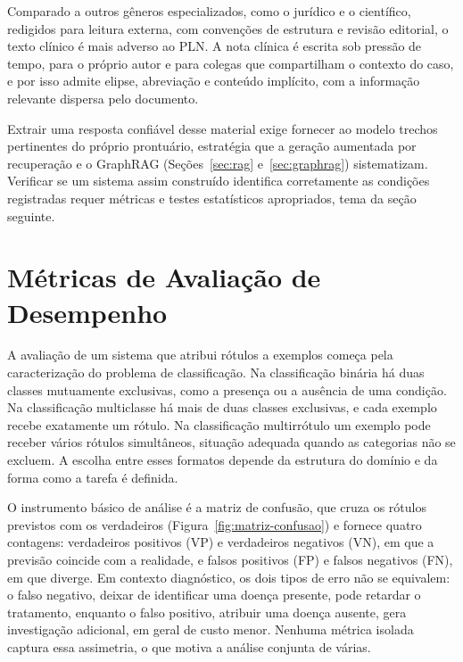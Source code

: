 Comparado a outros gêneros especializados, como o jurídico e o científico, redigidos para leitura externa, com convenções de estrutura e revisão editorial, o texto clínico é mais adverso ao PLN. A nota clínica é escrita sob pressão de tempo, para o próprio autor e para colegas que compartilham o contexto do caso, e por isso admite elipse, abreviação e conteúdo implícito, com a informação relevante dispersa pelo documento.

Extrair uma resposta confiável desse material exige fornecer ao modelo trechos pertinentes do próprio prontuário, estratégia que a geração aumentada por recuperação e o GraphRAG (Seções~\ref{sec:rag} e~\ref{sec:graphrag}) sistematizam. Verificar se um sistema assim construído identifica corretamente as condições registradas requer métricas e testes estatísticos apropriados, tema da seção seguinte.

\section{Métricas de Avaliação de Desempenho}\label{sec:avaliacao}

A avaliação de um sistema que atribui rótulos a exemplos começa pela caracterização do problema de classificação. Na classificação binária há duas classes mutuamente exclusivas, como a presença ou a ausência de uma condição. Na classificação multiclasse há mais de duas classes exclusivas, e cada exemplo recebe exatamente um rótulo. Na classificação multirrótulo um exemplo pode receber vários rótulos simultâneos, situação adequada quando as categorias não se excluem. A escolha entre esses formatos depende da estrutura do domínio e da forma como a tarefa é definida.

O instrumento básico de análise é a matriz de confusão, que cruza os rótulos previstos com os verdadeiros (Figura~\ref{fig:matriz-confusao}) e fornece quatro contagens: verdadeiros positivos (VP) e verdadeiros negativos (VN), em que a previsão coincide com a realidade, e falsos positivos (FP) e falsos negativos (FN), em que diverge. Em contexto diagnóstico, os dois tipos de erro não se equivalem: o falso negativo, deixar de identificar uma doença presente, pode retardar o tratamento, enquanto o falso positivo, atribuir uma doença ausente, gera investigação adicional, em geral de custo menor. Nenhuma métrica isolada captura essa assimetria, o que motiva a análise conjunta de várias.

